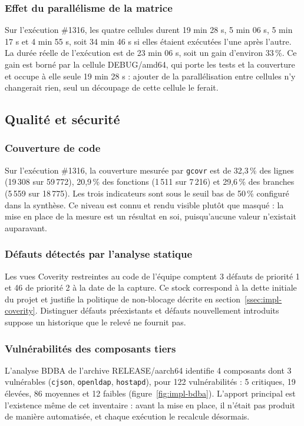 \subsubsection{Effet du parallélisme de la matrice}
Sur l'exécution \#1316, les quatre cellules durent 19 min 28 s, 5 min 06 s,
5 min 17 s et 4 min 55 s, soit 34 min 46 s si elles étaient exécutées l'une
après l'autre. La durée réelle de l'exécution est de 23 min 06 s, soit un gain
d'environ 33\,\%. Ce gain est borné par la cellule DEBUG/amd64, qui porte les
tests et la couverture et occupe à elle seule 19 min 28 s : ajouter de la
parallélisation entre cellules n'y changerait rien, seul un découpage de cette
cellule le ferait.

\subsection{Qualité et sécurité}
\label{sec:eval-qualite}

\subsubsection{Couverture de code}
Sur l'exécution \#1316, la couverture mesurée par \texttt{gcovr} est de
32,3\,\% des lignes (19\,308 sur 59\,772), 20,9\,\% des fonctions (1\,511 sur
7\,216) et 29,6\,\% des branches (5\,559 sur 18\,775). Les trois indicateurs
sont sous le seuil bas de 50\,\% configuré dans la synthèse. Ce niveau est
connu et rendu visible plutôt que masqué : la mise en place de la mesure est un
résultat en soi, puisqu'aucune valeur n'existait auparavant.

\subsubsection{Défauts détectés par l'analyse statique}
Les vues Coverity restreintes au code de l'équipe comptent 3 défauts de
priorité 1 et 46 de priorité 2 à la date de la capture. Ce stock correspond à
la dette initiale du projet et justifie la politique de non-blocage décrite en
section~\ref{ssec:impl-coverity}. Distinguer défauts préexistants et défauts
nouvellement introduits suppose un historique que le relevé ne fournit pas.

\subsubsection{Vulnérabilités des composants tiers}
L'analyse BDBA de l'archive RELEASE/aarch64 identifie 4 composants dont 3
vulnérables (\texttt{cjson}, \texttt{openldap}, \texttt{hostapd}), pour 122
vulnérabilités : 5 critiques, 19 élevées, 86 moyennes et 12 faibles
(figure~\ref{fig:impl-bdba}). L'apport principal est l'existence même de
cet inventaire : avant la mise en place, il n'était pas produit de manière
automatisée, et chaque exécution le recalcule désormais.

